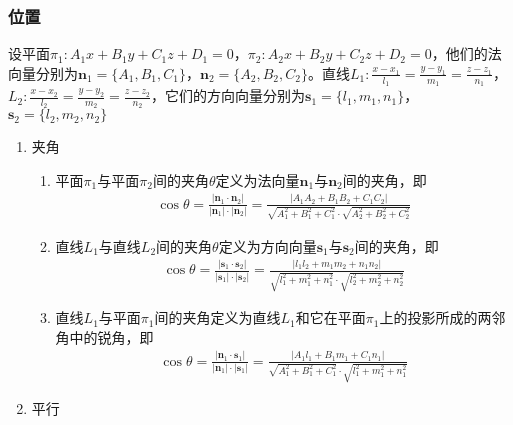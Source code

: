 \documentclass[12pt]{book}
\begin{document}
\subsubsection{位置}


设平面$\pi_{1}:A_{1}x+B_{1}y+C_{1}z+D_{1}=0$，$\pi_{2}:A_{2}x+B_{2}y+C_{2}z+D_{2}=0$，他们的法向量分别为$\bm{n}_1=\{A_1,B_1,C_1\}$，$\bm{n}_2=\{A_2,B_2,C_2\}$。直线$L_{1}:\frac{x-x_1}{l_1}=\frac{y-y_1}{m_1}=\frac{z-z_1}{n_1}$，$L_{2}:\frac{x-x_2}{l_2}=\frac{y-y_2}{m_2}=\frac{z-z_2}{n_2}$，它们的方向向量分别为$\bm{s}_1=\{l_1,m_1,n_1\}$，$\bm{s}_2=\{l_2,m_2,n_2\}$

\begin{enumerate}[1.]
    \item 夹角
          \begin{enumerate}[(1)]
              \item 平面$\pi_1$与平面$\pi_2$间的夹角$\theta$定义为法向量$\bm{n}_1$与$\bm{n}_2$间的夹角，即
                    \begin{gather*}
                        \cos{\theta}=\frac{|\bm{n}_{1}\cdot\bm{n}_{2}|}{|\bm{n}_{1}|\cdot|\bm{n}_{2}|}
                        = \frac{|A_{1}A_{2}+B_{1}B_{2}+C_{1}C_{2}|}{\sqrt{A_{1}^{2}+B_{1}^{2}+C_{1}^{2}}\cdot\sqrt{A_{2}^{2}+B_{2}^{2}+C_{2}^{2}}}
                    \end{gather*}
              \item 直线$L_1$与直线$L_2$间的夹角$\theta$定义为方向向量$\bm{s}_1$与$\bm{s}_2$间的夹角，即
                    \begin{gather*}
                        \cos{\theta}=\frac{|\bm{s}_{1}\cdot\bm{s}_{2}|}{|\bm{s}_{1}|\cdot|\bm{s}_{2}|}
                        = \frac{|l_{1}l_{2}+m_{1}m_{2}+n_{1}n_{2}|}{\sqrt{l_{1}^{2}+m_{1}^{2}+n_{1}^{2}}\cdot\sqrt{l_{2}^{2}+m_{2}^{2}+n_{2}^{2}}}
                    \end{gather*}
              \item 直线$L_1$与平面$\pi_1$间的夹角定义为直线$L_1$和它在平面$\pi_1$上的投影所成的两邻角中的锐角，即
                    \begin{gather*}
                        \cos{\theta}=\frac{|\bm{n}_{1}\cdot\bm{s}_{1}|}{|\bm{n}_{1}|\cdot|\bm{s}_{1}|}
                        = \frac{|A_{1}l_{1}+B_{1}m_{1}+C_{1}n_{1}|}{\sqrt{A_{1}^{2}+B_{1}^{2}+C_{1}^{2}}\cdot\sqrt{l_{1}^{2}+m_{1}^{2}+n_{1}^{2}}}
                    \end{gather*}
          \end{enumerate}
    \item 平行
          \begin{enumerate}[(1)]

\end{enumerate}
\end{enumerate}
\end{document}
